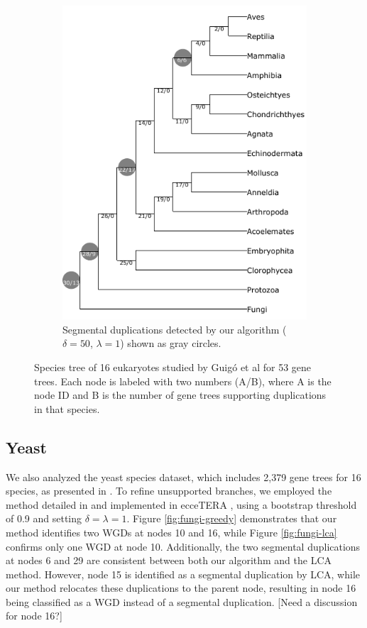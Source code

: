 \documentclass[10pt]{article}
\newcommand{\rk}[1]{\begingroup\color{red}#1\endgroup}
\begin{document}
\begin{figure}[h!]
\begin{subfigure}[b]{0.48\textwidth}
        \includegraphics[scale=0.7]{figs_shortversion/guigo_greedy50.pdf} %
        \caption{Segmental duplications detected by our algorithm ($\delta=50$, $\lambda=1$) shown as gray circles.}
        \label{fig:guigo-greedy}
    \end{subfigure}
    
    \caption{
        Species tree of 16 eukaryotes studied by Guigó et al for 53 gene trees. Each node is labeled with two numbers (A/B), where A is the node ID and B is the number of gene trees supporting duplications in that species.
    }
    \label{fig:guigo}
\end{figure}

\subsection{Yeast}
We also analyzed the yeast species dataset, which includes 2,379 gene trees for 16 species, as presented in \cite{butler2009evolution}. To refine unsupported branches, we employed the method detailed in \cite{jacox2017resolution} and implemented in ecceTERA \cite{jacox2016eccetera}, using a bootstrap threshold of 0.9 and setting $\delta = \lambda = 1$. Figure \ref{fig:fungi-greedy} demonstrates that our method identifies two WGDs at nodes 10 and 16, while Figure \ref{fig:fungi-lca} confirms only one WGD at node 10. Additionally, the two segmental duplications at nodes 6 and 29 are consistent between both our algorithm and the LCA method. However, node 15 is identified as a segmental duplication by LCA, while our method relocates these duplications to the parent node, resulting in node 16 being classified as a WGD instead of a segmental duplication. \rk{[Need a discussion for node 16?]}
\end{document}
